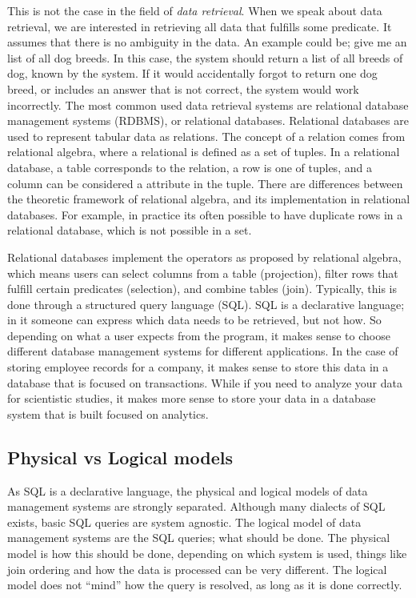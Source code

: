 This is not the case in the field of \emph{data retrieval}. When we speak about data retrieval, we are interested in retrieving all data that fulfills some predicate. It assumes that there is no ambiguity in the data. An example could be; give me an list of all dog breeds. In this case, the system should return a list of all breeds of dog, known by the system. If it would accidentally forgot to return one dog breed, or includes an answer that is not correct, the system would work incorrectly. 
The most common used data retrieval systems are relational database management systems (RDBMS), or relational databases. Relational databases are used to represent tabular data as relations. The concept of a relation comes from relational algebra, where a relational is defined as a set of tuples. In a relational database, a table corresponds to the relation, a row is one of tuples, and a column can be considered a attribute in the tuple. There are differences between the theoretic framework of relational algebra, and its implementation in relational databases. For example, in practice its often possible to have duplicate rows in a relational database, which is not possible in a set. 

Relational databases implement the operators as proposed by relational algebra, which means users can select columns from a table (projection), filter rows that fulfill certain predicates (selection), and combine tables (join). Typically, this is done through a structured query language (SQL).  
SQL is a declarative language; in it someone can express which data needs to be retrieved, but not how. So depending on what a user expects from the program, it makes sense to choose different database management systems for different applications. In the case of storing employee records for a company, it makes sense to store this data in a database that is focused on transactions. While if you need to analyze your data for scientistic studies, it makes more sense to store your data in a database system that is built focused on analytics.

\subsection{Physical vs Logical models}
As SQL is a declarative language, the physical and logical models of data management systems are strongly separated. Although many dialects of SQL exists, basic SQL queries are system agnostic. The logical model of data management systems are the SQL queries; what should be done. The physical model is how this should be done, depending on which system is used, things like join ordering and how the data is processed can be very different. The logical model does not ``mind'' how the query is resolved, as long as it is done correctly. 

